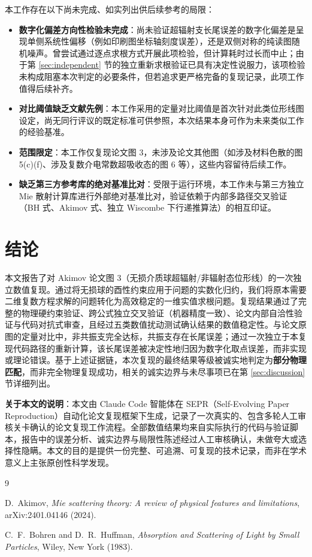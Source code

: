 \documentclass[12pt]{ctexart}
\begin{document}
本工作存在以下尚未完成、如实列出供后续参考的局限：

\begin{itemize}
  \item \textbf{数字化偏差方向性检验未完成}：尚未验证超辐射支长尾误差的数字化偏差是呈现单侧系统性偏移（例如印刷图坐标轴刻度误差），还是双侧对称的纯读图随机噪声。曾尝试通过逐点求根方式开展此项检验，但计算耗时过长而中止；由于第 \ref{sec:independent} 节的独立重新求根验证已具有决定性说服力，该项检验未构成阻塞本次判定的必要条件，但若追求更严格完备的复现记录，此项工作值得后续补齐。
  \item \textbf{对比阈值缺乏文献先例}：本工作采用的定量对比阈值是首次针对此类位形线图设定，尚无同行评议的既定标准可供参照，本次结果本身可作为未来类似工作的经验基准。
  \item \textbf{范围限定}：本工作仅复现论文图 3，未涉及论文其他图（如涉及材料色散的图 5(c)(f)、涉及复数介电常数超吸收态的图 6 等），这些内容留待后续工作。
  \item \textbf{缺乏第三方参考库的绝对基准比对}：受限于运行环境，本工作未与第三方独立 Mie 散射计算库进行外部绝对基准比对，验证依赖于内部多路径交叉验证（BH 式、Akimov 式、独立 Wiscombe 下行递推算法）的相互印证。
\end{itemize}

\section{结论}

本文报告了对 Akimov 论文图 3（无损介质球超辐射/非辐射态位形线）的一次独立数值复现。通过将无损球的酉性约束应用于问题的实数化归约，我们将原本需要二维复数方程求解的问题转化为高效稳定的一维实值求根问题。复现结果通过了完整的物理硬约束验证、跨公式独立交叉验证（机器精度一致）、论文内部自洽性验证与代码对抗式审查，且经过五类数值扰动测试确认结果的数值稳定性。与论文原图的定量对比中，非共振支完全达标，共振支存在长尾误差；通过一次独立于本复现代码路径的重新计算，该长尾误差被决定性地归因为数字化取点误差，而非实现或理论错误。基于上述证据链，本次复现的最终结果等级被诚实地判定为\textbf{部分物理匹配}，而非完全物理复现成功，相关的诚实边界与未尽事项已在第 \ref{sec:discussion} 节详细列出。

\bigskip
\noindent\textbf{关于本文的说明}：本文由 Claude Code 智能体在 SEPR（Self-Evolving Paper Reproduction）自动化论文复现框架下生成，记录了一次真实的、包含多轮人工审核关卡确认的论文复现工作流程。全部数值结果均来自实际执行的代码与验证脚本，报告中的误差分析、诚实边界与局限性陈述经过人工审核确认，未做夸大或选择性隐瞒。本文的目的是提供一份完整、可追溯、可复现的技术记录，而非在学术意义上主张原创性科学发现。

\begin{thebibliography}{9}

D.~Akimov,
\textit{Mie scattering theory: A review of physical features and limitations},
arXiv:2401.04146 (2024).

C.~F.~Bohren and D.~R.~Huffman,
\textit{Absorption and Scattering of Light by Small Particles},
Wiley, New York (1983).

\end{thebibliography}
\end{document}

